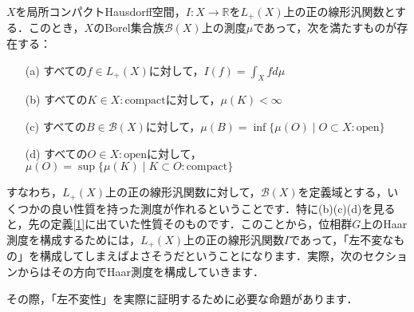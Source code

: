\begin{ythm}[Rieszの表現定理]\label{9}
$X$を局所コンパクトHausdorff空間，$I \colon X \to \mathbb{R}$を$L_{+}(X)$上の正の線形汎関数とする．このとき，$X$のBorel集合族$\mathscr{B}(X)$上の測度$\mu$であって，次を満たすものが存在する：
\begin{itemize}
 \item[(a)]すべての$f \in L_{+}(X)$に対して，$I(f)=\int_{X}fd\mu$
 \item[(b)]すべての$K \in X \colon \mathrm{compact}$に対して，$\mu(K)<\infty$
 \item[(c)]すべての$B \in \mathscr{B}(X)$に対して，$\mu(B)=\inf \{ \mu(O) \mid O \subset X \colon \mathrm{open} \}$
 \item[(d)]すべての$O \in X \colon \mathrm{open}$に対して，$\mu(O)=\sup \{ \mu(K) \mid K \subset O \colon \mathrm{compact} \}$
\end{itemize}
\end{ythm}
すなわち，$L_{+}(X)$上の正の線形汎関数に対して，$\mathscr{B}(X)$を定義域とする，いくつかの良い性質を持った測度が作れるということです．特に(b)(c)(d)を見ると，先の定義\ref{1}に出ていた性質そのものです．このことから，位相群$G$上のHaar測度を構成するためには，$L_{+}(X)$上の正の線形汎関数$I$であって，「左不変なもの」を構成してしまえばよさそうだということになります．実際，次のセクションからはその方向でHaar測度を構成していきます．

その際，「左不変性」を実際に証明するために必要な命題があります．

